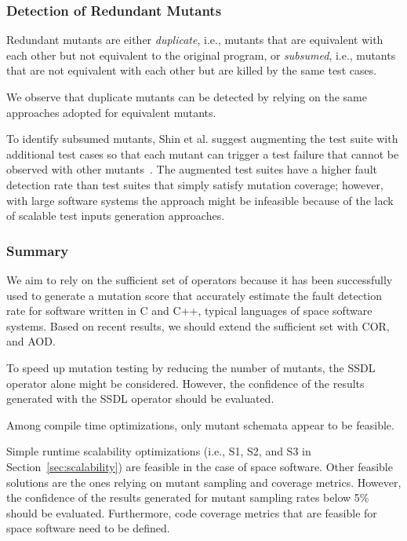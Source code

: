 \subsubsection{Detection of Redundant Mutants}

Redundant mutants are either \emph{duplicate}, i.e., mutants that are equivalent with each other but not equivalent to the original program, or \emph{subsumed}, i.e., mutants that are not equivalent with each other but are killed by the same test cases.

We observe that duplicate mutants can be detected by relying on the same approaches adopted for equivalent mutants.

To identify subsumed mutants, Shin et al. suggest augmenting the test suite with additional test cases so that each mutant can trigger a test failure that cannot be observed with other mutants~\cite{Shin:TSE:DCriterion:2018}.
The augmented test suites have a higher
 fault detection rate than test suites that simply satisfy mutation coverage; however, with large software systems the approach might be infeasible because of the lack of scalable test inputs generation approaches.


\subsubsection{Summary}

We aim to rely on the sufficient set of operators because it has been successfully used to generate a mutation score that accurately estimate the fault detection rate for software written in C and C++, typical languages of space software systems.
Based on recent results, we should extend the sufficient set with COR, and AOD.

To speed up mutation testing by reducing the number of mutants, the SSDL operator alone might be considered. However, the confidence of the results generated with the SSDL operator should be evaluated.

Among compile time optimizations, only mutant schemata appear to be feasible.

Simple runtime scalability optimizations (i.e., S1, S2, and S3 in Section~\ref{sec:scalability}) are feasible in the case of space software. Other feasible solutions are the ones relying on mutant sampling and coverage metrics. However, the confidence of the results generated for mutant sampling rates below 5\% should be evaluated. Furthermore, code coverage metrics that are feasible for space software need to be defined.

